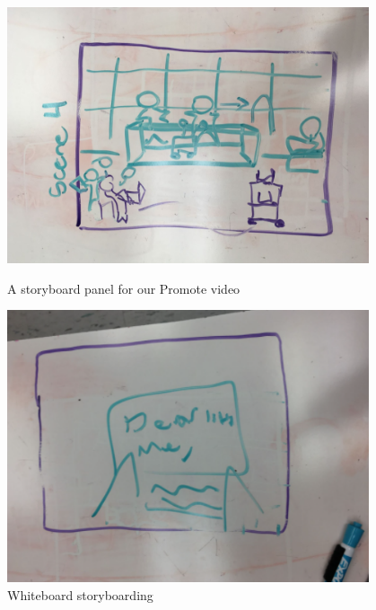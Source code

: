\begin{figure}[ht]
\centering
\begin{minipage}[b]{.48\textwidth}
  \centering
  \includegraphics[width=0.95\textwidth]{Meetings/January/01-07-22/1.7.22 - Falon Jones.png}
  \caption{A storyboard panel for our Promote video}
  \label{fig:010722_1}
\end{minipage}%
\hfill%
\begin{minipage}[b]{.48\textwidth}
  \centering
  \includegraphics[width=0.95\textwidth]{Meetings/January/01-07-22/1_7_22 - Falon Jones.png}
  \caption{Whiteboard storyboarding}
  \label{fig:010722_2}
\end{minipage}
\end{figure}


